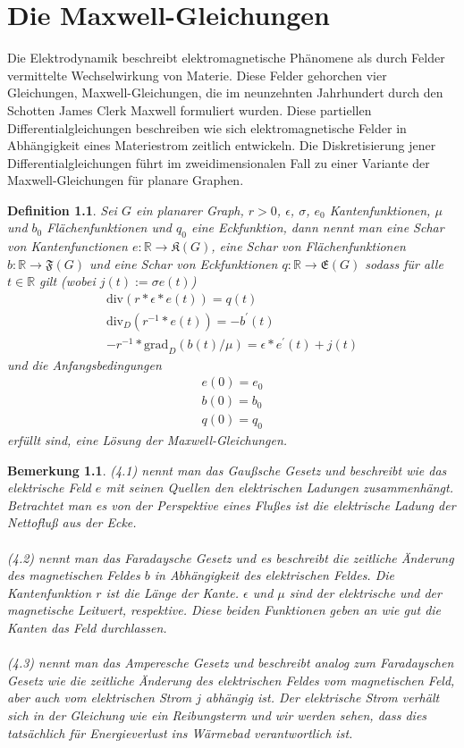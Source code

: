 \documentclass[11pt,a4paper,leqno]{report}
\newtheorem{definition}[theorem]{Definition}
\newtheorem{remark}[theorem]{Bemerkung}
\numberwithin{equation}{chapter}
\begin{document}
\chapter{Die Maxwell-Gleichungen}
Die Elektrodynamik beschreibt elektromagnetische Ph\"anomene als durch Felder vermittelte Wechselwirkung von Materie. Diese Felder gehorchen vier Gleichungen, Maxwell-Gleichungen, die im neunzehnten Jahrhundert durch den Schotten James Clerk Maxwell formuliert wurden. Diese partiellen Differentialgleichungen beschreiben wie sich elektromagnetische Felder in Abh\"angigkeit eines Materiestrom zeitlich entwickeln. Die Diskretisierung jener Differentialgleichungen  f\"uhrt im zweidimensionalen Fall zu einer Variante der Maxwell-Gleichungen f\"ur planare Graphen. 
\begin{definition}
	Sei $G$ ein planarer Graph, $r>0$, $\epsilon$, $\sigma$, $e_0$ Kantenfunktionen, $\mu$ und $b_0$ Fl\"achenfunktionen und $q_0$ eine Eckfunktion, dann nennt man eine Schar von Kantenfunctionen $e:\mathbb{R}\rightarrow\mathfrak{K}(G)$, eine Schar von Fl\"achenfunktionen $b:\mathbb{R}\rightarrow\mathfrak{F}(G)$ und eine Schar von Eckfunktionen $q:\mathbb{R}\rightarrow\mathfrak{E}(G)$ sodass f\"ur alle $t\in\mathbb{R}$ gilt (wobei $j(t) := \sigma e(t)$)
	\begin{align}
		\text{div}(r * \epsilon * e(t)) = q(t)\\
		\text{div}_D(r^{-1} * e(t)) = -b^\prime(t)\\
		-r^{-1} * \text{grad}_D(b(t) / \mu) = \epsilon * e^\prime(t) + j(t)
	\end{align} 
	und die Anfangsbedingungen
\begin{align}
	e(0) = e_0\\
	b(0) = b_0\\
	q(0) = q_0
\end{align}
erf\"ullt sind, eine L\"osung der Maxwell-Gleichungen.
\end{definition}
\begin{remark}
	(4.1) nennt man das Gau\ss{}sche Gesetz und beschreibt wie das elektrische Feld $e$ mit seinen Quellen den elektrischen Ladungen zusammenh\"angt. Betrachtet man es von der Perspektive eines Flu\ss{}es ist die elektrische Ladung der Nettoflu\ss{} aus der Ecke.\\
	\\
	(4.2) nennt man das Faradaysche Gesetz und es beschreibt die zeitliche \"Anderung des magnetischen Feldes $b$ in Abh\"angigkeit des elektrischen Feldes. Die Kantenfunktion $r$ ist die L\"ange der Kante. $\epsilon$ und $\mu$ sind der elektrische und der magnetische Leitwert, respektive. Diese beiden Funktionen geben an wie gut die Kanten das Feld durchlassen.\\
	\\
	(4.3) nennt man das Amperesche Gesetz und beschreibt analog zum Faradayschen Gesetz wie die zeitliche \"Anderung des elektrischen Feldes vom magnetischen Feld, aber auch vom elektrischen Strom $j$ abh\"angig ist. Der elektrische Strom verh\"alt sich in der Gleichung wie ein Reibungsterm und wir werden sehen, dass dies tats\"achlich f\"ur Energieverlust ins W\"armebad verantwortlich ist.
\end{remark}
\end{document}
